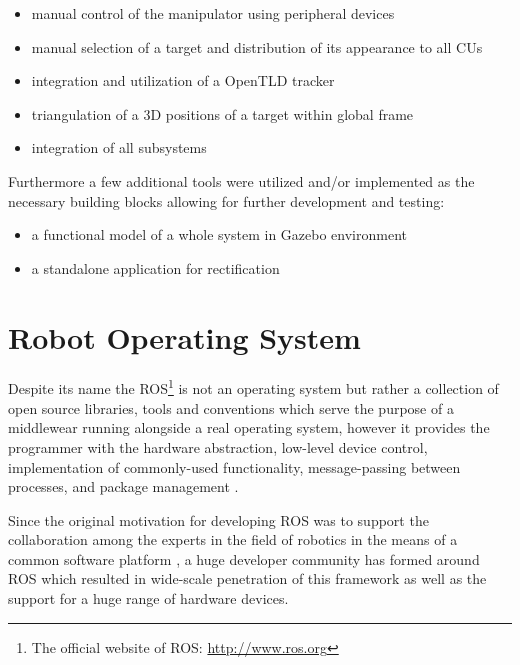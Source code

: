 \begin{itemize}
\item manual control of the manipulator using peripheral devices
\item manual selection of a target and distribution of its appearance to all CUs
\item integration and utilization of a OpenTLD tracker
\item triangulation of a 3D positions of a target within global frame
\item integration of all subsystems
\end{itemize}

Furthermore a few additional tools were utilized and/or implemented as the necessary building blocks allowing for further development and testing:

\begin{itemize}
\item a functional model of a whole system in Gazebo environment
\item a standalone application for rectification
\end{itemize}


\section{Robot Operating System} \label{txt:robot_operating_system}

Despite its name the ROS\footnote{The official website of ROS: \url{http://www.ros.org}} is not an operating system but rather a collection of open source libraries, tools and conventions which serve the purpose of a middlewear running alongside a real operating system, however it provides the programmer with the hardware abstraction,  low-level device control, implementation of commonly-used functionality,
message-passing between processes, and package management \cite{O'Kane201310}.

Since the original motivation for developing ROS was to support the collaboration among the experts in the field of robotics in the means of a common software platform \cite{ROS-an-open-source-Robot-Operating-System}, a huge developer community has formed around ROS which resulted in wide-scale penetration of this framework as well as the support for a huge range of hardware devices.

